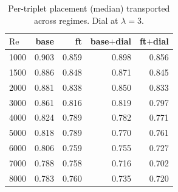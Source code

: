 \begin{table}[t]
  \centering
  \caption{Per-triplet placement (median) transported across regimes. Dial at $\lambda=3$.}
  \label{tab:transfer-placement}
  \begin{tabular}{lrrrr}
    \toprule
    $\mathrm{Re}$ & base & ft & base$+$dial & ft$+$dial \\
    \midrule
    1000 & 0.903 & 0.859 & 0.898 & 0.856 \\
    1500 & 0.886 & 0.848 & 0.871 & 0.845 \\
    2000 & 0.881 & 0.838 & 0.850 & 0.833 \\
    3000 & 0.861 & 0.816 & 0.819 & 0.797 \\
    4000 & 0.824 & 0.789 & 0.782 & 0.771 \\
    5000 & 0.818 & 0.789 & 0.770 & 0.761 \\
    6000 & 0.806 & 0.759 & 0.755 & 0.727 \\
    7000 & 0.788 & 0.758 & 0.716 & 0.702 \\
    8000 & 0.783 & 0.760 & 0.735 & 0.720 \\
    \bottomrule
  \end{tabular}
\end{table}
